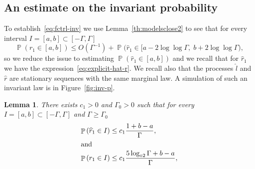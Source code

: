 \documentclass[10pt]{amsart}
\newtheorem{lemm}[theo]{Lemma}\newtheorem{prop}[theo]{Proposition}\newtheorem{coro}[theo]{Corollary}\newtheorem{conj}[theo]{Conjecture}
\theoremstyle{definition}\newtheorem{defi}[theo]{Definition}\newtheorem{rema}[theo]{Remark}\newtheorem{exam}[theo]{Example}\newtheorem{exem}[theo]{Example}\newtheorem{nota}[theo]{Notation}
\newcommand{\gG}{\Gamma}
\newcommand{\ls}{\widehat{l}}
\newcommand{\rs}{\widehat{r}}
\newcommand{\loglog}{\log_{\circ 2}}
\DeclareMathOperator{\p}{\mathbb{P}}
\begin{document}
\subsection{An estimate on the invariant probability}\label{sec:nu}

To establish~\eqref{eq:fctrl-inv} we use Lemma~\ref{th:modelsclose2} to see that for every interval $I=[a, b] \subset [-\Gamma, \Gamma]$
\begin{equation}\label{eq:pre-obs-inv}
\p\left(r_1 \in [a, b]\right) \le O(\Gamma^{-1}) + \p\bigl(\widehat r_1 \in [a- 2 \log\log \gG,\; b+ 2\log \log \gG\bigr),
\end{equation}
so we reduce the issue to estimating $\p\left(\rs_1 \in [a, b]\right)$ and we recall that for $\rs_1$ we have the expression~\eqref{eq:explicit-hat-r}. We recall also that the processes $\ls$ and $\rs$ are stationary sequences with the same marginal law. A simulation of such an invariant law is in Figure~\ref{fig:inv-p}.

\begin{lemm}\label{th:ctrl-inv}
There exists $c_1>0$ and $\gG_0>0$ such that for every $I =[a, b]\subset [-\Gamma, \Gamma]$ and $\Gamma\ge \Gamma_0$
\begin{align}
\p\left(\widehat r_1\in I\right) &\le c_1 \frac{1+b-a}{\Gamma},\label{eq:ctrl-inv}
\\
\intertext{and}
\p\left(r_1\in I\right) &\le c_1 \frac{5\loglog \gG+b-a}{\Gamma},\label{eq:ctrl-inv2}
\end{align}
\end{lemm}
\end{document}
